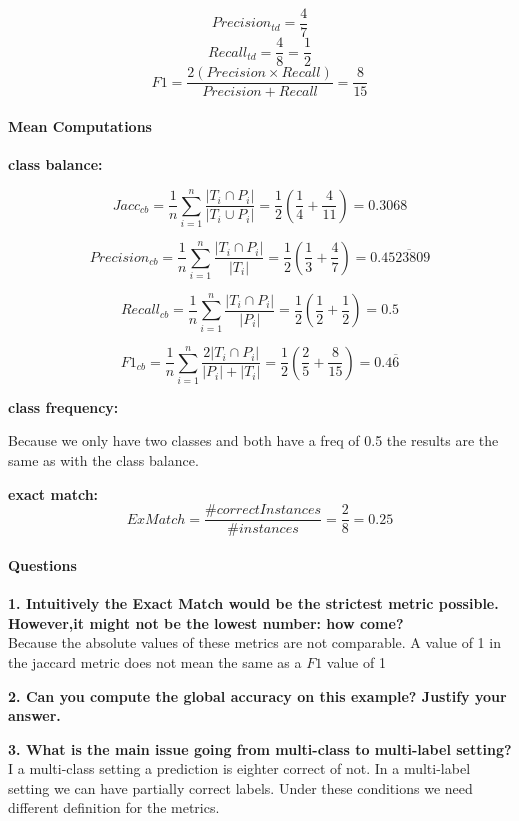 \documentclass[10pt]{article}
\begin{document}
$$Precision_{td} = \frac{4}{7}$$
$$Recall_{td} = \frac{4}{8} = \frac{1}{2}$$
$$F1 = \frac{2(Precision\times Recall)}{Precision + Recall} = \frac{8}{15}$$

\paragraph{Mean Computations\\}

\textbf{class balance:}

 $$Jacc_{cb} =\frac{1}{n}\sum_{i=1}^{n} \frac{|{T_i}\cap{P_i}|}{|{T_i}\cup{P_i}|} = \frac{1}{2}\left(\frac{1}{4}+\frac{4}{11}\right)= 0.3068$$
 
$$Precision_{cb} =\frac{1}{n}\sum_{i=1}^{n} \frac{|{T_i}\cap{P_i}|}{|T_i|}= \frac{1}{2}\left(\frac{1}{3}+\frac{4}{7}\right) = 0.4\overline{523809}$$

$$Recall_{cb} =\frac{1}{n}\sum_{i=1}^{n} \frac{|{T_i}\cap{P_i}|}{|P_i|} = \frac{1}{2} \left(\frac{1}{2} + \frac{1}{2}\right) = 0.5$$
 
$$F1_{cb} =\frac{1}{n}\sum_{i=1}^{n} \frac{2|{T_i}\cap{P_i}|}{|P_i|+|T_i|} = \frac{1}{2}\left(\frac{2}{5}+\frac{8}{15}\right) = 0.4\overline{6}$$

\textbf{class frequency:}

Because we only have two classes and both have a freq of 0.5 the results are the same as with the class balance.

\textbf{exact match:}
$$ ExMatch = \frac{\#correct Instances}{\# instances} = \frac{2}{8} = 0.25 $$

\paragraph{Questions\\}

\textbf{1. Intuitively the Exact Match would be the strictest metric possible. However,it might not be the lowest number: how come?\\}
Because the absolute values of these metrics are not comparable. A value of 1 in the jaccard metric does not mean the same as a $F1$ value of 1

\textbf{2. Can you compute the global accuracy on this example? Justify your answer.\\}

\textbf{3. What is the main issue going from multi-class to multi-label setting?\\}
I a multi-class setting a prediction is eighter correct of not. In a multi-label setting we can have partially correct labels. Under these conditions we need different definition for the metrics.

   
\end{document}
